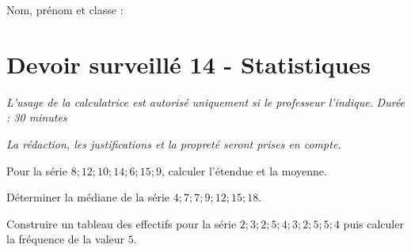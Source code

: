 \documentclass[a4paper,10pt]{report}
\begin{document}
\pagestyle{empty}
\noindent Nom, prénom et classe : \dotfill

\section*{Devoir surveillé 14 - Statistiques}

\noindent \textit{L'usage de la calculatrice est autorisé uniquement si le professeur l'indique.} \hfill \textit{Durée : 30 minutes}

\medskip
\noindent \textit{La rédaction, les justifications et la propreté seront prises en compte.}


\begin{ex}[Indicateurs]
Pour la série $8; 12; 10; 14; 6; 15; 9$, calculer l'étendue et la moyenne.
\medskip\noindent\grandscarreaux{\linewidth}{4cm}
\end{ex}
\begin{ex}[Médiane]
Déterminer la médiane de la série $4; 7; 7; 9; 12; 15; 18$.
\medskip\noindent\grandscarreaux{\linewidth}{3cm}
\end{ex}
\begin{ex}[Tableau]
Construire un tableau des effectifs pour la série $2;3;2;5;4;3;2;5;5;4$ puis calculer la fréquence de la valeur $5$.
\medskip\noindent\grandscarreaux{\linewidth}{5cm}
\end{ex}
\end{document}

